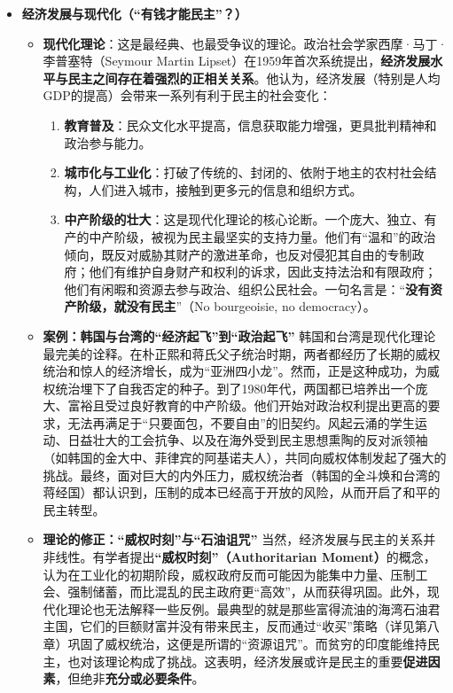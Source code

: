 \begin{itemize}
    \item \textbf{经济发展与现代化（“有钱才能民主”？）}
    \begin{itemize}
        \item \textbf{现代化理论}：这是最经典、也最受争议的理论。政治社会学家西摩·马丁·李普塞特（Seymour Martin Lipset）在1959年首次系统提出，\textbf{经济发展水平与民主之间存在着强烈的正相关关系}。他认为，经济发展（特别是人均GDP的提高）会带来一系列有利于民主的社会变化：
        \begin{enumerate}
            \item \textbf{教育普及}：民众文化水平提高，信息获取能力增强，更具批判精神和政治参与能力。
            \item \textbf{城市化与工业化}：打破了传统的、封闭的、依附于地主的农村社会结构，人们进入城市，接触到更多元的信息和组织方式。
            \item \textbf{中产阶级的壮大}：这是现代化理论的核心论断。一个庞大、独立、有产的中产阶级，被视为民主最坚实的支持力量。他们有“温和”的政治倾向，既反对威胁其财产的激进革命，也反对侵犯其自由的专制政府；他们有维护自身财产和权利的诉求，因此支持法治和有限政府；他们有闲暇和资源去参与政治、组织公民社会。一句名言是：“\textbf{没有资产阶级，就没有民主}”（No bourgeoisie, no democracy）。
        \end{enumerate}
        \item \textbf{案例：韩国与台湾的“经济起飞”到“政治起飞”}
        韩国和台湾是现代化理论最完美的诠释。在朴正熙和蒋氏父子统治时期，两者都经历了长期的威权统治和惊人的经济增长，成为“亚洲四小龙”。然而，正是这种成功，为威权统治埋下了自我否定的种子。到了1980年代，两国都已培养出一个庞大、富裕且受过良好教育的中产阶级。他们开始对政治权利提出更高的要求，无法再满足于“只要面包，不要自由”的旧契约。风起云涌的学生运动、日益壮大的工会抗争、以及在海外受到民主思想熏陶的反对派领袖（如韩国的金大中、菲律宾的阿基诺夫人），共同向威权体制发起了强大的挑战。最终，面对巨大的内外压力，威权统治者（韩国的全斗焕和台湾的蒋经国）都认识到，压制的成本已经高于开放的风险，从而开启了和平的民主转型。
        \item \textbf{理论的修正：“威权时刻”与“石油诅咒”}
        当然，经济发展与民主的关系并非线性。有学者提出\textbf{“威权时刻”（Authoritarian Moment）}的概念，认为在工业化的初期阶段，威权政府反而可能因为能集中力量、压制工会、强制储蓄，而比混乱的民主政府更“高效”，从而获得巩固。此外，现代化理论也无法解释一些反例。最典型的就是那些富得流油的海湾石油君主国，它们的巨额财富并没有带来民主，反而通过“收买”策略（详见第八章）巩固了威权统治，这便是所谓的“资源诅咒”。而贫穷的印度能维持民主，也对该理论构成了挑战。这表明，经济发展或许是民主的重要\textbf{促进因素}，但绝非\textbf{充分或必要条件}。

\end{itemize}
\end{itemize}
